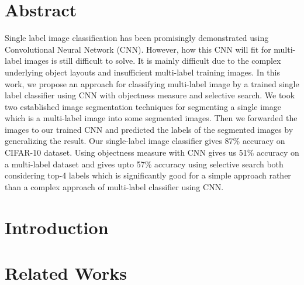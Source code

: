 \documentclass[12pt]{report}
\theoremstyle{plain}
\theoremstyle{definition}
\begin{document}
\chapter*{Abstract}
Single label image classification has been promisingly demonstrated using Convolutional Neural Network (CNN). However, how this CNN will fit for multi-label images is still difficult to solve. It is mainly difficult due to the complex underlying
object layouts and insufficient multi-label training images. In this work, we propose an approach for classifying multi-label image by a trained single label classifier using CNN with objectness measure and selective search. We took two established image segmentation techniques for segmenting a single image which is a multi-label image into some segmented images. Then we forwarded the images to our trained CNN and predicted the labels of the segmented images by generalizing the result. Our single-label image classifier gives 87\% accuracy on CIFAR-10 dataset. Using objectness measure with CNN gives us 51\% accuracy on a multi-label dataset and gives upto 57\% accuracy using selective search both considering top-4 labels which is significantly good for a simple approach rather than a complex approach of multi-label classifier using CNN.




\tableofcontents
\listoffigures
{}


\chapter{Introduction}
\setcounter{page}{2}


\chapter{Related Works}

\end{document}
